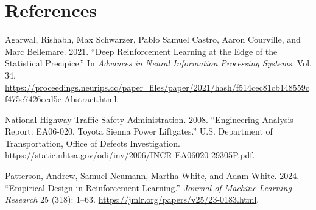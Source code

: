 \documentclass[
  10pt,
]{article}
\newlength{\cslhangindent}
\newenvironment{CSLReferences}[2] %
 {\begin{list}{}{%
  \setlength{\itemindent}{0pt}
  \setlength{\leftmargin}{0pt}
  \setlength{\parsep}{0pt}
  \ifodd #1
   \setlength{\leftmargin}{\cslhangindent}
   \setlength{\itemindent}{-1\cslhangindent}
  \fi
  \setlength{\itemsep}{#2\baselineskip}}}
 {\end{list}}
\begin{document}
\section{References}\label{references}

\label{refs}
\begin{CSLReferences}{1}{0}
Agarwal, Rishabh, Max Schwarzer, Pablo Samuel Castro, Aaron Courville,
and Marc Bellemare. 2021. {``Deep Reinforcement Learning at the Edge of
the Statistical Precipice.''} In \emph{Advances in Neural Information
Processing Systems}. Vol. 34.
\url{https://proceedings.neurips.cc/paper_files/paper/2021/hash/f514cec81cb148559cf475e7426eed5e-Abstract.html}.

National Highway Traffic Safety Administration. 2008. {``Engineering
Analysis Report: EA06-020, Toyota Sienna Power Liftgates.''} U.S.
Department of Transportation, Office of Defects Investigation.
\url{https://static.nhtsa.gov/odi/inv/2006/INCR-EA06020-29305P.pdf}.

Patterson, Andrew, Samuel Neumann, Martha White, and Adam White. 2024.
{``Empirical Design in Reinforcement Learning.''} \emph{Journal of
Machine Learning Research} 25 (318): 1--63.
\url{https://jmlr.org/papers/v25/23-0183.html}.

\end{CSLReferences}
\end{document}
